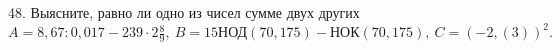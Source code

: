 48. Выясните, равно ли одно из чисел сумме двух других\\
$A=8,67:0,017-239\cdot2\frac{8}{9},\ B=15\text{НОД}(70, 175)-\text{НОК}(70,175),\ C=(-2,(3))^2.$\\
